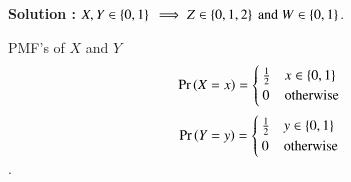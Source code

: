 \documentclass[journal,12pt,twocolumn]{IEEEtran}
\newenvironment{Proof}[2] {\textbf{Solution : }}{\hfill$\cdot$}
\begin{document}
\begin{Proof}{}{}
 $X, Y \in \left\{0,1\right\}
 \\\implies Z \in \left\{0,1,2\right\} \text{ and } W \in \left\{0,1\right\}$.
 \begin{lemma}
 PMF's of $X$ and $Y$
 \begin{equation}
         \Pr\left(X=x\right) = 
     \begin{cases}
      \frac{1}{2} & x \in \left\{0,1\right\}\\
      0 & \text{otherwise}
     \end{cases}
 \end{equation}
  \begin{equation}
         \Pr\left(Y=y\right) = 
     \begin{cases}
      \frac{1}{2} & y \in \left\{0,1\right\}\\
      0 & \text{otherwise}
     \end{cases}
 \end{equation}
 \end{lemma}
 

\end{Proof}
\end{document}
